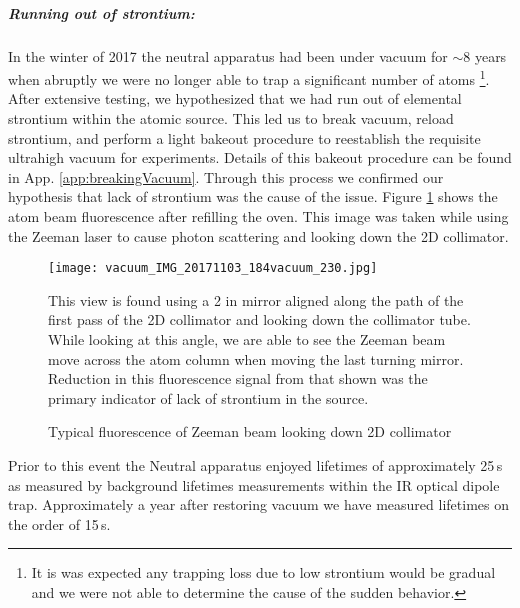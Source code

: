 \subparagraph{Running out of strontium:}
In the winter of 2017 the neutral apparatus had been under vacuum for $\sim$8 years when abruptly we were no longer able to trap a significant number of atoms \footnote{It is was expected any trapping loss due to low strontium would be gradual and we were not able to determine the cause of the sudden behavior.}.
After extensive testing, we hypothesized that we had run out of elemental strontium within the atomic source.
This led us to break vacuum, reload strontium, and perform a light bakeout procedure to reestablish the requisite ultrahigh vacuum for experiments.
Details of this bakeout procedure can be found in App. \ref{app:breakingVacuum}. 
Through this process we confirmed our hypothesis that lack of strontium was the cause of the issue. 
Figure \ref{fig:2d_coll_flourescence} shows the atom beam fluorescence after refilling the oven.
This image was taken while using the Zeeman laser to cause photon scattering and looking down the 2D collimator.
	\begin{figure}
		\centerline{
		\texttt{[image: vacuum\_IMG\_20171103\_184vacuum\_230.jpg]}}
		\caption{Typical fluorescence of Zeeman beam looking down 2D collimator}{This view is found using a 2 in mirror aligned along the path of the first pass of the 2D collimator and looking down the collimator tube. While looking at this angle, we are able to see the Zeeman beam move across the atom column when moving the last turning mirror. Reduction in this fluorescence signal from that shown was the primary indicator of lack of strontium in the source.}
		\label{fig:2d_coll_flourescence}
	\end{figure}  
Prior to this event the Neutral apparatus enjoyed lifetimes of approximately 25\,s as measured by background lifetimes measurements within the IR optical dipole trap. 
Approximately a year after restoring vacuum we have measured lifetimes on the order of 15\,s.

